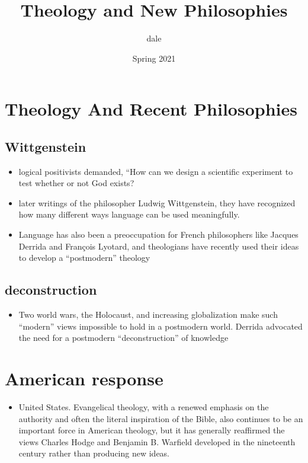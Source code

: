 \documentclass[11pt]{article}
\author{dale}
\date{Spring 2021}
\title{Theology and New Philosophies}
\begin{document}
\maketitle
\setcounter{tocdepth}{1}
\tableofcontents


\section*{Theology And Recent Philosophies}
\label{theology-and-recent-philosophies}
\subsection*{Wittgenstein}
\label{wittgenstein}
\begin{itemize}
\item logical positivists demanded, “How can we design a scientific experiment to test whether or not God exists?
\item later writings of the philosopher Ludwig Wittgenstein, they have recognized how many different ways language can be used meaningfully.
\item Language has also been a preoccupation for French philosophers like Jacques Derrida and François Lyotard, and theologians have recently used their ideas to develop a “postmodern” theology
\end{itemize}

\subsection*{deconstruction}
\label{deconstruction}
\begin{itemize}
\item Two world wars, the Holocaust, and increasing globalization make such “modern” views impossible to hold in a postmodern world. Derrida advocated the need for a postmodern “deconstruction” of knowledge
\end{itemize}

\section*{American response}
\label{american-response}
\begin{itemize}
\item United States. Evangelical theology, with a renewed emphasis on the authority and often the literal inspiration of the Bible, also continues to be an important force in American theology, but it has generally reaffirmed the views Charles Hodge and Benjamin B. Warfield developed in the nineteenth century rather than producing new ideas.
\end{itemize}
\end{document}
